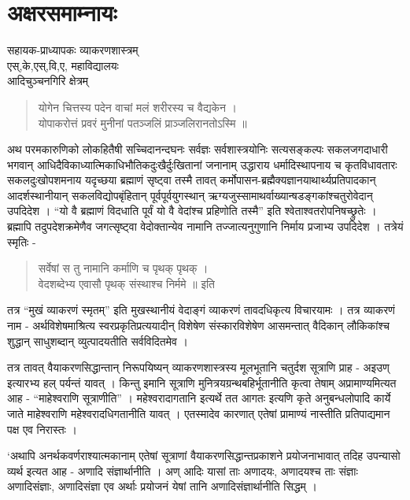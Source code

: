 \chapter{अक्षरसमाम्नायः}

\begin{center}
\smallskip

सहायक-प्राध्यापकः व्याकरणशास्त्रम्\\
एस्,के,एस्,वि,ए, महाविद्यालयः\\
आदिचुञ्चनगिरि क्षेत्रम् 
\end{center}

\begin{verse}
योगेन चित्तस्य पदेन वाचां मलं शरीरस्य च वैद्यकेन ।\\
योपाकरोत्तं प्रवरं मुनीनां पतञ्जलिं प्राञ्जलिरानतोऽस्मि ॥
\end{verse}
अथ परमकारुणिको लोकहितैषी सच्चिदानन्दघनः सर्वज्ञः सर्वशास्त्रयोनिः सत्यसङ्कल्पः सकलजगदाधारी भगवान् आधिदैविकाध्यात्मिकाधिभौतिकदुःखैर्दुःखितानां जनानाम् उद्धाराय धर्मादिस्थापनाय च कृतविधावतारः सकलदुःखोपशमनाय यदृच्छया ब्रह्माणं सृष्ट्वा तस्मै तावत् कर्मोपासन-ब्रह्मैक्यज्ञानयाथार्थ्यप्रतिपादकान् आदर्शस्थानीयान् सकलविद्योपबृंहितान् पूर्वपूर्वयुगस्थान् ऋग्यजुस्सामाथर्वाख्यान्षडङ्गकांश्चतुरोवेदान् उपदिदेश । “यो वै ब्रह्माणं विदधाति पूर्वं यो वै वेदांश्च प्रहिणोति तस्मै” इति श्वेताश्वतरोपनिषच्छ्रुतेः । ब्रह्मापि तदुपदेशक्रमेणैव जगत्सृष्ट्वा वेदोक्तान्येव नामानि तज्जात्यनुगुणानि निर्माय प्रजाभ्य उपदिदेश । तत्रेयं स्मृतिः -		
\begin{verse}
सर्वेषां स तु नामानि कर्माणि च पृथक् पृथक् ।\\
वेदशब्देभ्य एवासौ पृथक् संस्थाश्च निर्ममे ॥ इति
\end{verse} 		
तत्र “मुखं व्याकरणं स्मृतम्” इति मुखस्थानीयं वेदाङ्गं व्याकरणं तावदधिकृत्य विचारयामः । तत्र व्याकरणं नाम  - अर्थविशेषमाश्रित्य स्वरप्रकृतिप्रत्ययादीन् विशेषेण संस्कारविशेषेण आसमन्तात्  वैदिकान् लौकिकांश्च शुद्धान् साधुशब्दान् व्युत्पादयतीति सर्वविदितमेव ।

तत्र तावत् वैयाकरणसिद्धान्तान् निरूपयिष्यन् व्याकरणशास्त्रस्य मूलभूतानि चतुर्दश सूत्राणि प्राह - अइउण् इत्यारभ्य हल् पर्यन्तं यावत् । किन्तु इमानि सूत्राणि मुनित्रयग्रन्थबहिर्भूतानीति कृत्वा तेषाम् अप्रामाण्यमित्यत आह - “माहेश्वराणि सूत्राणीति” । महेश्वरादागतानि इत्यर्थे तत आगतः इत्यणि कृते अनुबन्धलोपादि कार्ये जाते माहेश्वराणि महेश्वरादधिगतानीति यावत् । एतस्मादेव कारणात् एतेषां प्रामाण्यं नास्तीति प्रतिपाद्यमान पक्ष एव निरास्तः ।

‘अथापि अनर्थकवर्णराश्यात्मकानाम् एतेषां सूत्राणां वैयाकरणसिद्धान्तप्रकाशने प्रयोजनाभावात् तदिह उपन्यासो व्यर्थ इत्यत आह - अणादि संज्ञार्थानीति । अण् आदिः  यासां ताः अणादयः, अणादयश्च ताः संज्ञाः अणादिसंज्ञाः, अणादिसंज्ञा एव अर्थाः  प्रयोजनं येषां तानि अणादिसंज्ञार्थानीति सिद्धम् । 

